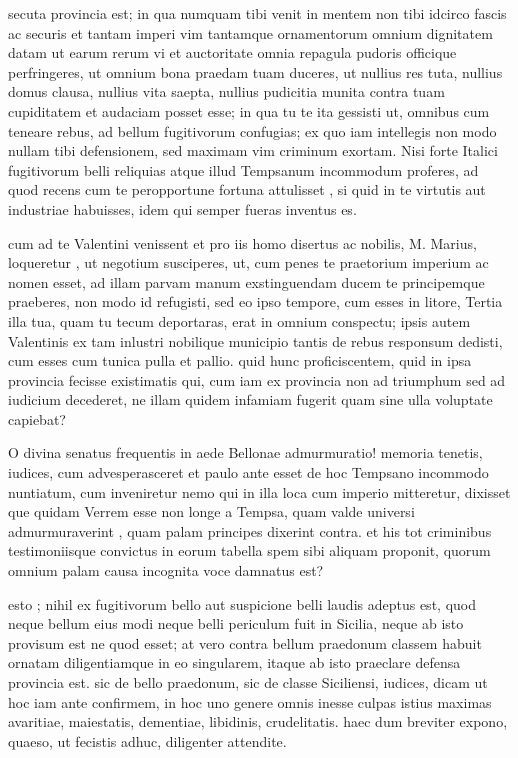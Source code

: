  secuta provincia est; in qua numquam tibi venit in mentem non tibi idcirco fascis ac securis et tantam imperi vim tantamque ornamentorum omnium dignitatem datam ut earum rerum vi et auctoritate omnia repagula pudoris officique perfringeres, ut omnium bona praedam tuam duceres, ut nullius res tuta, nullius domus clausa, nullius vita saepta, nullius pudicitia munita contra tuam cupiditatem et audaciam posset esse; in qua tu te ita gessisti ut, omnibus cum teneare rebus, ad bellum fugitivorum confugias; ex quo iam intellegis non modo nullam tibi defensionem, sed maximam vim criminum exortam. Nisi forte Italici fugitivorum belli reliquias atque illud Tempsanum incommodum proferes, ad quod recens cum te peropportune fortuna attulisset , si quid in te virtutis aut industriae habuisses, idem qui semper fueras inventus es.

 cum ad te Valentini venissent et pro iis homo disertus ac nobilis, M. Marius, loqueretur , ut negotium susciperes, ut, cum penes te praetorium imperium ac nomen esset, ad illam parvam manum exstinguendam ducem te principemque praeberes, non modo id refugisti, sed eo ipso tempore, cum esses in litore, Tertia illa tua, quam tu tecum deportaras, erat in omnium conspectu; ipsis autem Valentinis ex tam inlustri nobilique municipio tantis de rebus responsum dedisti, cum esses cum tunica pulla et pallio. quid hunc proficiscentem, quid in ipsa provincia fecisse existimatis qui, cum iam ex provincia non ad triumphum sed ad iudicium decederet, ne illam quidem infamiam fugerit quam sine ulla voluptate capiebat?

 O divina senatus frequentis in aede Bellonae admurmuratio! memoria tenetis, iudices, cum advesperasceret et paulo ante esset de hoc Tempsano incommodo nuntiatum, cum inveniretur nemo qui in illa loca cum imperio mitteretur, dixisset que quidam Verrem esse non longe a Tempsa, quam valde universi admurmuraverint , quam palam principes dixerint contra. et his tot criminibus testimoniisque convictus in eorum tabella spem sibi aliquam proponit, quorum omnium palam causa incognita voce damnatus est?

 esto ; nihil ex fugitivorum bello aut suspicione belli laudis adeptus est, quod neque bellum eius modi neque belli periculum fuit in Sicilia, neque ab isto provisum est ne quod esset; at vero contra bellum praedonum classem habuit ornatam diligentiamque in eo singularem, itaque ab isto praeclare defensa provincia est. sic de bello praedonum, sic de classe Siciliensi, iudices, dicam ut hoc iam ante confirmem, in hoc uno genere omnis inesse culpas istius maximas avaritiae, maiestatis, dementiae, libidinis, crudelitatis. haec dum breviter expono, quaeso, ut fecistis adhuc, diligenter attendite.

